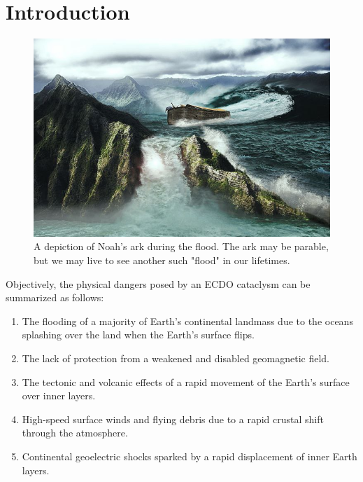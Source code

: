 \documentclass[10pt,twocolumn,letterpaper]{article}
\begin{document}
\section{Introduction}

\begin{figure}[b]
\begin{center}
   \includegraphics[width=1\linewidth]{noah.jpg}
\end{center}
   \caption{A depiction of Noah's ark during the flood. The ark may be parable, but we may live to see another such "flood" in our lifetimes. \cite{2}}
\label{fig:1}
\label{fig:onecol}
\end{figure}

Objectively, the physical dangers posed by an ECDO cataclysm can be summarized as follows:

\begin{flushleft}
\begin{enumerate}
    \item The flooding of a majority of Earth's continental landmass due to the oceans splashing over the land when the Earth's surface flips.
    \item The lack of protection from a weakened and disabled geomagnetic field.
    \item The tectonic and volcanic effects of a rapid movement of the Earth's surface over inner layers.
    \item High-speed surface winds and flying debris due to a rapid crustal shift through the atmosphere.
    \item Continental geoelectric shocks sparked by a rapid displacement of inner Earth layers.
\end{enumerate}
\end{flushleft}
\end{document}
